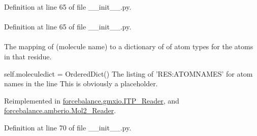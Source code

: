 \-Definition at line 65 of file \-\_\-\-\_\-init\-\_\-\-\_\-.\-py.

\hypertarget{classforcebalance_1_1BaseReader_a80c8e3bea212600742968aa8669e557b}{
\paragraph[{ln}]{}}\label{classforcebalance_1_1BaseReader_a80c8e3bea212600742968aa8669e557b}


\-Definition at line 65 of file \-\_\-\-\_\-init\-\_\-\-\_\-.\-py.

\hypertarget{classforcebalance_1_1BaseReader_ab444c213e15929253dd73395ac5f19fc}{
\paragraph[{molatom}]{}}\label{classforcebalance_1_1BaseReader_ab444c213e15929253dd73395ac5f19fc}


\-The mapping of (molecule name) to a dictionary of of atom types for the atoms in that residue. 

self.\-moleculedict = \-Ordered\-Dict() \-The listing of '\-R\-E\-S\-:\-A\-T\-O\-M\-N\-A\-M\-E\-S' for atom names in the line \-This is obviously a placeholder. 

\-Reimplemented in \hyperlink{classforcebalance_1_1gmxio_1_1ITP__Reader_a5ed800499e9442adaea0cee243960f94}{forcebalance.\-gmxio.\-I\-T\-P\-\_\-\-Reader}, and \hyperlink{classforcebalance_1_1amberio_1_1Mol2__Reader_acdeaabdae39b208fb9430ee4cd6de113}{forcebalance.\-amberio.\-Mol2\-\_\-\-Reader}.



\-Definition at line 70 of file \-\_\-\-\_\-init\-\_\-\-\_\-.\-py.

